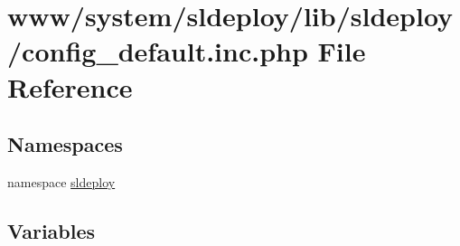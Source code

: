 \hypertarget{config__default_8inc_8php}{
\section{www/system/sldeploy/lib/sldeploy/config\_\-default.inc.php File Reference}
\label{config__default_8inc_8php}
}
\subsection*{Namespaces}
\begin{DoxyCompactItemize}
\item 
namespace \hyperlink{namespacesldeploy}{sldeploy}
\end{DoxyCompactItemize}
\subsection*{Variables}
